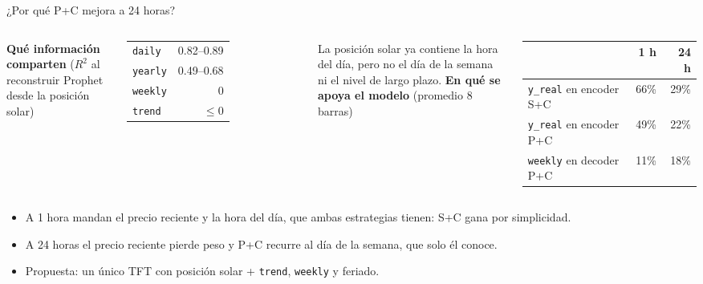 \documentclass[aspectratio=169]{beamer}
\begin{document}
\begin{frame}{¿Por qué P+C mejora a 24 horas?}
    \footnotesize
    \begin{columns}[T]
        \textbf{Qué información comparten} ($R^2$ al reconstruir Prophet desde la posición solar)
        \begin{table}
            \centering
            \begin{tabular}{lr}
                \toprule
                \texttt{daily}  & 0.82--0.89 \\
                \texttt{yearly} & 0.49--0.68 \\
                \texttt{weekly} & 0 \\
                \texttt{trend}  & $\le 0$ \\
                \bottomrule
            \end{tabular}
        \end{table}
        La posición solar ya contiene la hora del día, pero no el día de la semana ni el nivel de largo plazo.
        \textbf{En qué se apoya el modelo} (promedio 8 barras)
        \begin{table}
            \centering
            \begin{tabular}{lrr}
                \toprule
                & 1 h & 24 h \\
                \midrule
                \texttt{y\_real} en encoder S+C & 66\% & 29\% \\
                \texttt{y\_real} en encoder P+C & 49\% & 22\% \\
                \texttt{weekly} en decoder P+C  & 11\% & 18\% \\
                \bottomrule
            \end{tabular}
        \end{table}
    \end{columns}
    \vspace{0.4em}
    \begin{itemize}
        \item A 1 hora mandan el precio reciente y la hora del día, que ambas estrategias tienen: S+C gana por simplicidad.
        \item A 24 horas el precio reciente pierde peso y P+C recurre al día de la semana, que solo él conoce.
        \item Propuesta: un único TFT con posición solar + \texttt{trend}, \texttt{weekly} y feriado.
    \end{itemize}
\end{frame}
\end{document}
